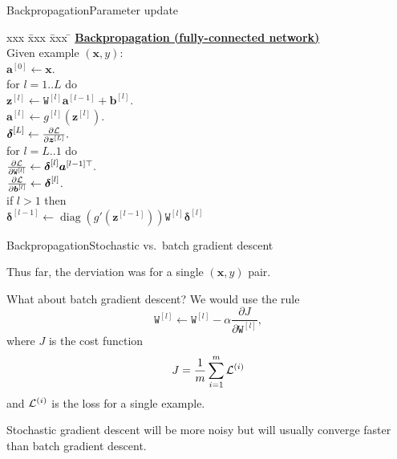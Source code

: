 \documentclass{beamer}
\renewcommand{\vec}[1]{\boldsymbol{#1}}
\newcommand{\mat}[1]{\mathtt{#1}}
\DeclareMathOperator*{\diag}{diag}
\begin{document}
\begin{frame}{Backpropagation}{Parameter update}

  \begin{tabbing}
    xxx \= xxx \= xxx \= \kill
    \underline{\textbf{Backpropagation (fully-connected network)}} \\
    Given example $(\vec{x},y)$:\\
    \> $\vec{a}^{[0]} \leftarrow \vec{x}.$ \\
    \> for $l = 1..L$ do \\
    \> \> $\vec{z}^{[l]} \leftarrow \mat{W}^{[l]} \vec{a}^{[l-1]} + \vec{b}^{[l]}.$ \\
    \> \> $\vec{a}^{[l]} \leftarrow g^{[l]}(\vec{z}^{[l]})$. \\
    \> $\vec{\delta}^{[L]} \leftarrow \frac{\partial \cal L}{\partial \vec{z}^{[L]}}.$ \\
    \> for $l = L..1$ do\\
    \> \> $\frac{\partial \cal L}{\partial \mat{W}^{[l]}} \leftarrow \vec{\delta}^{[l]} \vec{a}^{[l-1]\top}.$ \\
    \> \> $\frac{\partial \cal L}{\partial \vec{b}^{[l]}} \leftarrow \vec{\delta}^{[l]}$.\\
    \> \> if $l > 1$ then\\
    \> \> \> $\vec{\delta}^{[l-1]} \leftarrow
    \diag(g'(\vec{z}^{[l-1]}))
    \mat{W}^{[l]}
    \vec{\delta}^{[l]}$
  \end{tabbing}

\end{frame}


\begin{frame}{Backpropagation}{Stochastic vs.\ batch gradient descent}

  Thus far, the derviation was for a single $(\vec{x},y)$ pair.

  \medskip

  What about batch gradient descent? We would use the rule
  \[ \mat{W}^{[l]} \leftarrow \mat{W}^{[l]} - \alpha \frac{\partial J}{\partial \mat{W}^{[l]}}, \]
  where $J$ is the cost function
  \[ J = \frac{1}{m}\sum_{i=1}^m {\cal L}^{(i)} \]
  and ${\cal L}^{(i)}$ is the loss for a single example.

  \medskip

  Stochastic gradient descent will be more noisy but will usually
  converge faster than batch gradient descent.

\end{frame}
\end{document}
